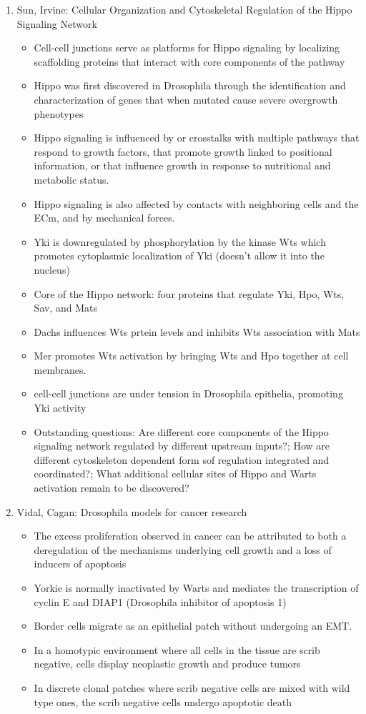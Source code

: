 \documentclass[12pt]{article}
\begin{document}
\begin{enumerate}
\item Sun, Irvine: Cellular Organization and Cytoskeletal Regulation of the Hippo Signaling Network
\begin{itemize}
	\item Cell-cell junctions serve as platforms for Hippo signaling by localizing scaffolding proteins that interact with core components of the pathway
	\item Hippo was first discovered in Drosophila through the identification and characterization of genes that when mutated cause severe overgrowth phenotypes
	\item Hippo signaling is influenced by or crosstalks with multiple pathways that respond to growth factors, that promote growth linked to positional information, or that influence growth in response to nutritional and metabolic status. 
	\item Hippo signaling is also affected by contacts with neighboring cells and the ECm, and by mechanical forces. 
	\item Yki is downregulated by phosphorylation by the kinase Wts which promotes cytoplasmic localization of Yki (doesn't allow it into the nucleus)
	\item Core of the Hippo network: four proteins that regulate Yki, Hpo, Wts, Sav, and Mats
	\item Dachs influences Wts prtein levels and inhibits Wts association with Mats
	\item Mer promotes Wts activation by bringing Wts and Hpo together at cell membranes. 
	\item cell-cell junctions are under tension in Drosophila epithelia, promoting Yki activity
	\item Outstanding questions: Are different core components of the Hippo signaling network regulated by different upstream inputs?; How are different cytoskeleton dependent form sof regulation integrated and coordinated?; What additional cellular sites of Hippo and Warts activation remain to be discovered?
\end{itemize}

\item Vidal, Cagan: Drosophila models for cancer research
\begin{itemize}
	\item The excess proliferation observed in cancer can be attributed to both a deregulation of the mechanisms underlying cell growth and a loss of inducers of apoptosis
	\item Yorkie is normally inactivated by Warts and mediates the transcription of cyclin E and DIAP1 (Drosophila inhibitor of apoptosis 1)
	\item Border cells migrate as an epithelial patch without undergoing an EMT. 
	\item In a homotypic environment where all cells in the tissue are scrib negative, cells display neoplastic growth and produce tumors
	\item In discrete clonal patches where scrib negative cells are mixed with wild type ones, the scrib negative cells undergo apoptotic death


\end{itemize}
\end{enumerate}
\end{document}
